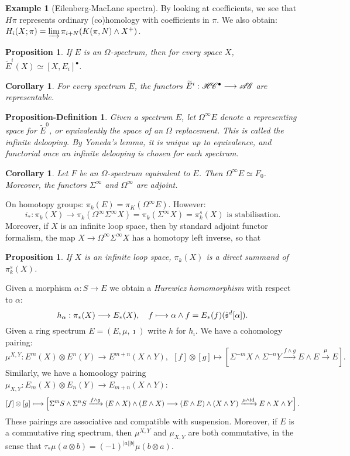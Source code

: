 \documentclass[11pt]{article}
\theoremstyle{plain}
\newtheorem{prop}[thm]{Proposition}
\newtheorem{cor}[thm]{Corollary}
\newtheorem{propdef}[thm]{Proposition-Definition}
\theoremstyle{definition}
\newtheorem{exmp}[thm]{Example}
\newcommand{\HC}{\scrH\!\scrC}
\newcommand{\AG}{\scrA\!\scrG}
\begin{document}
{\begin{exmp}[Eilenberg-MacLane spectra]
By looking at coefficients, we see that $H\pi$ represents ordinary (co)homology
with coefficients in $\pi$. We also obtain:
$H_i(X;\pi)=\varinjlim\pi_{i+N}(K(\pi,N)\wedge X^+)$.
\end{exmp}
\begin{prop}
If $E$ is an $\Omega$-spectrum, then for every space $X$,
$\widetilde E^i(X)\simeq[X,E_i]^\bullet$.
\end{prop}
\begin{cor}
For every spectrum $E$, the functors $\widetilde E^i:\HC^\bullet\to\AG$ are
representable.
\end{cor}
\begin{propdef}
Given a spectrum $E$, let $\Omega^\infty E$ denote a representing space for
$\widetilde E^0$, or equivalently the \ZEROTH space of an $\Omega$ replacement.
This is called the \emph{infinite delooping}. By Yoneda's lemma, it is unique up
to equivalence, and functorial once an infinite delooping is chosen for each
spectrum.
\end{propdef}
\setcounter{thm}{28}
\begin{cor}
Let $F$ be an $\Omega$-spectrum equivalent to $E$. Then $\Omega^\infty E\simeq
F_0$. Moreover, the functors $\Sigma^\infty$ and $\Omega^\infty$ are adjoint.
\end{cor}
\noindent On homotopy groups: $\pi_k(E)=\pi_K(\Omega^\infty E)$. However:
\[i_*:\pi_k(X)\to\pi_k(\Omega^\infty\Sigma^\infty X)=
\pi_k(\Sigma^\infty X)=\pi^s_k(X)\text{ \ is stabilisation.}\]
Moreover, if $X$ is an infinite loop space, then by standard adjoint functor
formalism, the map $X\to\Omega^\infty\Sigma^\infty X$ has a homotopy left
inverse, so that
\begin{prop}
If $X$ is an infinite loop space, $\pi_k(X)$ is a direct summand of
$\pi_k^s(X)$.
\end{prop}
Given a morphism $\alpha:S\to E$ we obtain a \emph{Hurewicz homomorphism} with
respect to $\alpha$:
\[h_\alpha:\pi_*(X)\longrightarrow E_*(X),\ \ \ f\longmapsto \alpha\wedge f=
E_*(f)(\hat{\mathfrak{s}}^d[\alpha]).\]
Given a ring spectrum $E=(E,\mu,\imath)$ write $h$ for $h_\imath$. We have
a cohomology pairing:
\[\mu^{X,Y}:E^m(X)\otimes E^n(Y)\to E^{m+n}(X\wedge Y),\ \ 
[f]\otimes[g]\mapsto \left[\Sigma^{-m}X\wedge\Sigma^{-n}Y\xrightarrow{f\wedge
g}E\wedge E\xrightarrow{\mu}E\right].\]
Similarly, we have a homoology pairing 
$\mu_{X,Y}:E_m(X)\otimes E_n(Y)\to E_{m+n}(X\wedge Y)$:
\[[f]\otimes[g]\longmapsto\left[\Sigma^mS\wedge\Sigma^nS\xrightarrow{f\wedge
g}(E\wedge X)\wedge(E\wedge X)\longrightarrow(E\wedge E)\wedge(X\wedge
Y)\xrightarrow{\mu\wedge\textup{id}}E\wedge X\wedge Y\right].\]
These pairings are associative and compatible with suspension. Moreover, if $E$
is a commutative ring spectrum, then $\mu^{X,Y}$ and $\mu_{X,Y}$ are both
commutative, in the sense that $\tau_*\mu(a\otimes b)=(-1)^{|a||b|}\mu(b\otimes
a)$.

}
\end{document}
